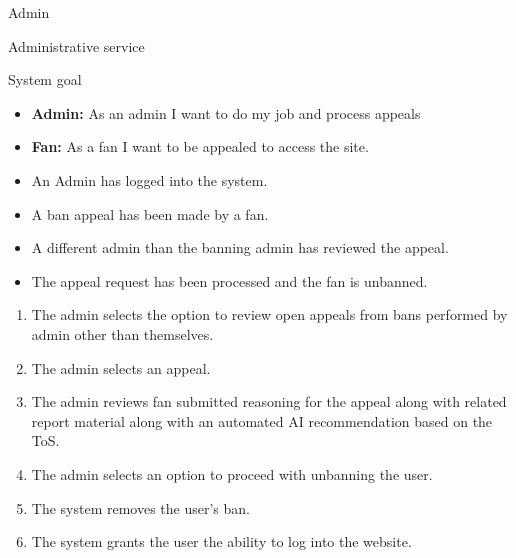 \documentclass[11pt]{report}
\begin{document}
\begin{description}[leftmargin=2.2cm, style=nextline]
  \item[Primary Actor] Admin
  \item[Scope] Administrative service
  \item[Level] System goal
  \item[Stakeholders \& Interests]
    \begin{itemize}
      \item \textbf{Admin:} As an admin I want to do my job and process appeals
      \item \textbf{Fan:} As a fan I want to be appealed to access the site.
    \end{itemize}
  \item[Preconditions]
    \begin{itemize}
      \item An Admin has logged into the system.
      \item A ban appeal has been made by a fan.

    \end{itemize}
  \item[Postconditions (Success Guarantee)]
    \begin{itemize}
      \item A different admin than the banning admin has reviewed the appeal.
      \item The appeal request has been processed and the fan is unbanned.

    \end{itemize}
  \item[Main Success Scenario]
    \begin{enumerate}
      \item The admin selects the option to review open appeals from bans performed by admin other than themselves.
      \item The admin selects an appeal.
      \item The admin reviews fan submitted reasoning for the appeal along with related report material along with an automated AI recommendation based on the ToS.
      \item The admin selects an option to proceed with unbanning the user.
      \item The system removes the user's ban.
      \item The system grants the user the ability to log into the website.


\end{enumerate}
\end{description}
\end{document}
